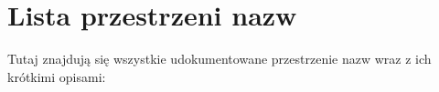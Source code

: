 \section{Lista przestrzeni nazw}
Tutaj znajdują się wszystkie udokumentowane przestrzenie nazw wraz z ich krótkimi opisami:\begin{DoxyCompactList}
\item{}
\item{}
\end{DoxyCompactList}
